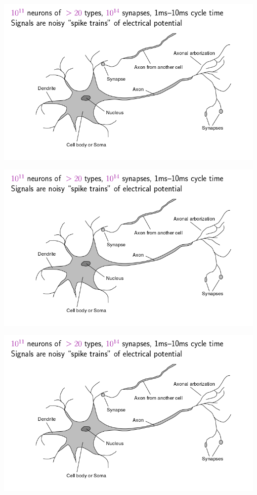\documentclass{beamer}
\begin{document}
\begin{frame}{}
    \begin{center}
        \includegraphics[scale=0.4]{brains.png}
    \end{center}
\end{frame}
\begin{frame}{}
    \begin{center}
        \includegraphics[scale=0.4]{brains.png}
    \end{center}
\end{frame}
\begin{frame}{}
    \begin{center}
        \includegraphics[scale=0.4]{brains.png}
    \end{center}
\end{frame}
\end{document}
